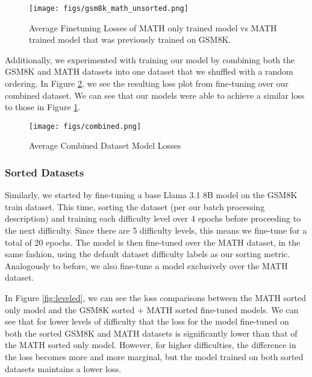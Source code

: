\begin{figure}[h!]
    \centering
    \texttt{[image: figs/gsm8k\_math\_unsorted.png]}
    \caption{Average Finetuning Losses of MATH only trained model vs MATH trained model that was previously trained on GSM8K.}
    \label{fig:gsm8k_math_unsorted}
\end{figure}

Additionally, we experimented with training our model by combining both the GSM8K and MATH datasets into one dataset that we shuffled with a random ordering. In Figure \ref{fig:combined}, we see the resulting loss plot from fine-tuning over our combined dataset. We can see that our models were able to achieve a similar loss to those in Figure \ref{fig:gsm8k_math_unsorted}.

\begin{figure}[h!]
    \centering
    \texttt{[image: figs/combined.png]}
    \caption{Average Combined Dataset Model Losses}
    \label{fig:combined}
\end{figure}

\subsubsection{Sorted Datasets}

Similarly, we started by fine-tuning a base Llama 3.1 8B model on the GSM8K train dataset. This time, sorting the dataset (per our batch processing description) and training each difficulty level over 4 epochs before proceeding to the next difficulty. Since there are 5 difficulty levels, this means we fine-tune for a total of 20 epochs. The model is then fine-tuned over the MATH dataset, in the same fashion, using the default dataset difficulty labels as our sorting metric. Analogously to before, we also fine-tune a model exclusively over the MATH dataset.

In Figure \ref{fig:leveled}, we can see the loss comparisons between the MATH sorted only model and the GSM8K sorted + MATH sorted fine-tuned models. We can see that for lower levels of difficulty that the loss for the model fine-tuned on both the sorted GSM8K and MATH datasets is significantly lower than that of the MATH sorted only model. However, for higher difficulties, the difference in the loss becomes more and more marginal, but the model trained on both sorted datasets maintains a lower loss.

